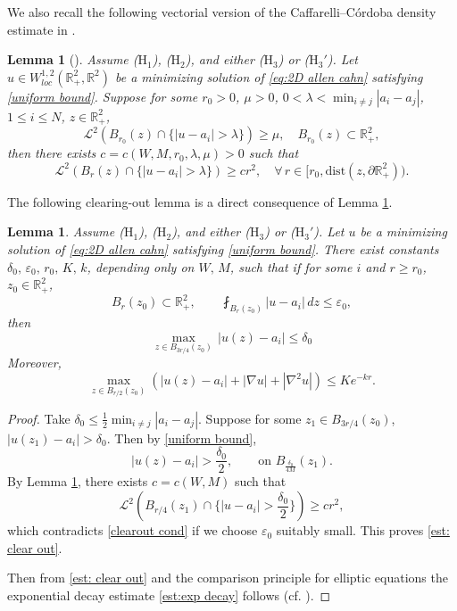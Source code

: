 \documentclass[leqno,11pt]{amsart}
\let\pa=\partial
\let\d=\delta
\let\f=\frac
\let\e=\varepsilon
\let\pa=\partial
\let\na=\nabla
\newtheorem{lemma}[theorem]{Lemma}
\theoremstyle{remark}
\newcommand{\dist}{\mathrm{dist}}
\newcommand{\BR}{\mathbb{R}}
\begin{document}
We also recall the following vectorial version of the Caffarelli--C\'{o}rdoba density estimate in \cite{AF3}.
\begin{lemma}[\cite{AF3}]\label{lem:cafarelli-cordoba}
Assume ($\mathrm{H}_1$), ($\mathrm{H}_2$), and either ($\mathrm{H}_3$) or ($\mathrm{H}_3'$). Let $u\in W^{1,2}_{loc}(\BR_+^2,\BR^2)$ be a minimizing solution of \eqref{eq:2D allen cahn} satisfying \eqref{uniform bound}. Suppose for some $r_0>0$, $\mu>0$, $0<\lambda<\min_{i\neq j}|a_i-a_j|$, $1\leq i\leq N$, $z\in\BR_+^2$,
\begin{equation*}
    \mathcal{L}^2(B_{r_0}(z)\cap\{|u-a_i|>\lambda\})\geq \mu,\quad B_{r_0}(z)\subset \BR_+^2,
\end{equation*}
then there exists $c=c(W,M,r_0,\lambda,\mu)>0$  such that 
\begin{equation*}
    \mathcal{L}^2(B_{r}(z)\cap\{|u-a_i|>\lambda\})\geq cr^2,\quad \forall\, r\in[r_0,\dist(z,\pa \BR_+^2)).
\end{equation*}
\end{lemma}

The following clearing-out lemma is a direct consequence of Lemma \ref{lem:cafarelli-cordoba}.

\begin{lemma}\label{lem: clear out}
    Assume ($\mathrm{H}_1$), ($\mathrm{H}_2$), and either ($\mathrm{H}_3$) or ($\mathrm{H}_3'$). Let $u$ be a minimizing solution of \eqref{eq:2D allen cahn} satisfying \eqref{uniform bound}. There exist constants $\delta_0,\,\e_0,\,r_0,\, K,\,k$, depending only on $W,\,M$, such that if for some $i$ and $r\geq r_0$, $z_0\in \BR_+^2$,
    \begin{equation}\label{clearout cond}
        B_{r}(z_0)\subset \BR_+^2,\qquad \fint_{B_{r}(z_0)} |u-a_i|\,dz\leq \e_0,
    \end{equation}
    then 
    \begin{equation}\label{est: clear out}
        \max\limits_{z\in B_{3  r/4}(z_0)}\,|u(z)-a_i|\leq \delta_0
    \end{equation}
    Moreover,
    \begin{equation}
        \label{est:exp decay}
        \max\limits_{z\in B_{r/2}(z_0)} \left( |u(z)-a_i|+|\na u|+|\na^2 u|\right)\leq Ke^{-kr}. 
    \end{equation}
\end{lemma}
\begin{proof}
Take $\delta_0\leq \f12\min_{i\neq j}|a_i-a_j|$. Suppose for some $z_1\in B_{3r/4}(z_0)$, $|u(z_1)-a_i|>\delta_0$. Then by \eqref{uniform bound},
\[
|u(z)-a_i|>\f{\d_0}{2},\qquad \text{on }B_{\f{\d_0}{4M}}(z_1).
\]
By Lemma \ref{lem:cafarelli-cordoba}, there exists $c=c(W,M)$ such that 
\[
\mathcal{L}^2(B_{r/4}(z_1)\cap\{|u-a_i|>\f{\d_0}{2}\})\geq cr^2,
\]
which contradicts \eqref{clearout cond} if we choose $\e_0$ suitably small. This proves \eqref{est: clear out}.

Then from \eqref{est: clear out} and the comparison principle for elliptic equations the exponential decay estimate \eqref{est:exp decay} follows (cf. \cite[Proposition 6.4]{afs-book}). 

\end{proof}
\end{document}
